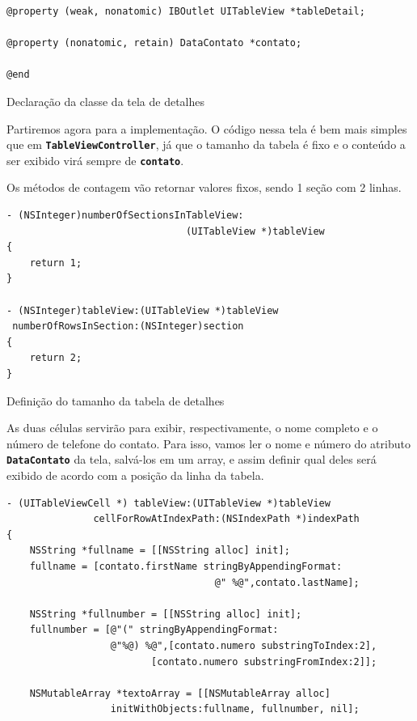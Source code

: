 \documentclass[a4paper,12pt,brazil,doubleside]{book}
\begin{document}
\begin{singlespace}
\begin{listing}[H]
\begin{verbatim}
@property (weak, nonatomic) IBOutlet UITableView *tableDetail;

@property (nonatomic, retain) DataContato *contato;

@end
\end{verbatim}
\caption{Declaração da classe da tela de detalhes}
\end{listing}


Partiremos agora para a implementação. O código nessa tela é bem mais simples que em \texttt{\textbf{TableViewController}}, já que o tamanho da tabela é fixo e o conteúdo a ser exibido virá sempre de \texttt{\textbf{contato}}.

Os métodos de contagem vão retornar valores fixos, sendo 1 seção com 2 linhas.

\begin{listing}[H]
\begin{verbatim}
- (NSInteger)numberOfSectionsInTableView:
                               (UITableView *)tableView
{        
    return 1;
}

- (NSInteger)tableView:(UITableView *)tableView
 numberOfRowsInSection:(NSInteger)section
{
    return 2;
}
\end{verbatim}
\caption{Definição do tamanho da tabela de detalhes}
\end{listing}


As duas células servirão para exibir, respectivamente, o nome completo e o número de telefone do contato. Para isso, vamos ler o nome e número do atributo \texttt{\textbf{DataContato}} da tela, salvá-los em um array, e assim definir qual deles será exibido de acordo com a posição da linha da tabela.

\begin{listing}[H]
\begin{verbatim}
- (UITableViewCell *) tableView:(UITableView *)tableView
               cellForRowAtIndexPath:(NSIndexPath *)indexPath
{
    NSString *fullname = [[NSString alloc] init];
    fullname = [contato.firstName stringByAppendingFormat:
                                    @" %@",contato.lastName];
    
    NSString *fullnumber = [[NSString alloc] init];
    fullnumber = [@"(" stringByAppendingFormat:
                  @"%@) %@",[contato.numero substringToIndex:2],
                         [contato.numero substringFromIndex:2]];
    
    NSMutableArray *textoArray = [[NSMutableArray alloc]
                  initWithObjects:fullname, fullnumber, nil];


\end{verbatim}
\end{listing}
\end{singlespace}
\end{document}
